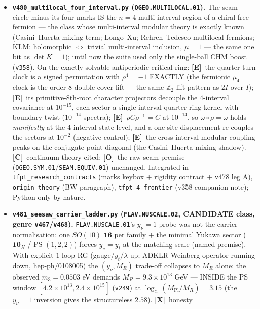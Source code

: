 \documentclass[11pt]{article}
\providecommand{\mE}{\textbf{[E]}}\providecommand{\mC}{\textbf{[C]}}
\providecommand{\mO}{\textbf{[O]}}\providecommand{\mX}{\textbf{[X]}}
\providecommand{\cthree}{c_3}\providecommand{\phiz}{\varphi_0^{\mathrm{ret}}}
\providecommand{\Mbar}{\bar M_{\mathrm{Pl}}}\providecommand{\Z}{\mathbb{Z}}\providecommand{\PP}{\mathbb{P}}
\begin{document}
\begin{itemize}[leftmargin=1.5em]
vector over $\Z$, $\sum\delta_i^2{=}120{=}4\cdot30$, $30{=}2\cdot3\cdot5$, dimension count $=4$;
lake build clean, \texttt{\#print axioms} $=$ the three standard kernel axioms only).
\item \textbf{\texttt{v480\_multilocal\_four\_interval.py} (\texttt{QGEO.MULTILOCAL.01}).} The seam circle
minus its four marks IS the $n{=}4$ multi-interval region of a chiral free fermion --- the class whose
multi-interval modular theory is exactly known (Casini--Huerta mixing term; Longo--Xu; Rehren--Tedesco
multilocal fermions; KLM: holomorphic $\Leftrightarrow$ trivial multi-interval inclusion, $\mu{=}1$ ---
the same one bit as $\det K{=}1$); until now the suite used only the single-ball CHM boost (\texttt{v358}).
On the exactly solvable antiperiodic critical ring: \mE\ the quarter-turn clock is a signed permutation
with $\rho^4{=}{-}1$ EXACTLY (the fermionic $\mu_4$ clock is the order-$8$ double-cover lift --- the same
$\Z_2$-lift pattern as $2I$ over $I$); \mE\ its primitive-$8$th-root character projectors decouple the
$4$-interval covariance at $10^{-15}$, each sector a single-interval quarter-ring kernel with boundary
twist ($10^{-14}$ spectra); \mE\ $\rho C\rho^{-1}{=}C$ at $10^{-14}$, so $\omega\circ\rho{=}\omega$ holds
\emph{manifestly} at the $4$-interval state level, and a one-site displacement re-couples the sectors at
$10^{-2}$ (negative control); \mE\ the cross-interval modular coupling peaks on the conjugate-point
diagonal (the Casini--Huerta mixing shadow). \mC\ continuum theory cited; \mO\ the raw-seam premise
(\texttt{QGEO.SYM.01}/\texttt{SEAM.EQUIV.01}) unchanged. Integrated in \texttt{tfpt\_research\_contracts}
(marks keybox $+$ rigidity contract $+$ v478 leg A), \texttt{origin\_theory} (BW paragraph),
\texttt{tfpt\_4\_frontier} (v358 companion note); Python-only by nature.
\item \textbf{\texttt{v481\_seesaw\_carrier\_ladder.py} (\texttt{FLAV.NUSCALE.02}, CANDIDATE class, genre
\texttt{v467}/\texttt{v468}).} \texttt{FLAV.NUSCALE.01}'s $y_\nu{=}1$ probe was not the carrier
normalisation: one $SO(10)$ $\mathbf{16}$ per family $+$ the minimal Yukawa sector ($\mathbf{10}_H$ / PS
$(1,2,2)$) forces $y_\nu{=}y_t$ at the matching scale (named premise). With explicit $1$-loop RG
(gauge/$y_t$/$\lambda$ up; ADKLR Weinberg-operator running down, hep-ph/0108005) the $(y_\nu,M_R)$
trade-off collapses to $M_R$ alone: the observed $m_3{=}0.0503$ eV demands $M_R{=}9.3{\times}10^{13}$ GeV
--- INSIDE the PS window $[4.2{\times}10^{13},2.4{\times}10^{15}]$ (\texttt{v249}) at
$\log_{\cthree}(\Mbar/M_R){=}3.15$ (the $y_\nu{=}1$ inversion gives the structureless $2.58$). \mX\ honesty

\end{itemize}
\end{document}
